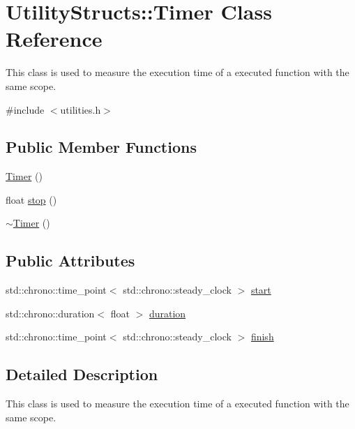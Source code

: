 \hypertarget{class_utility_structs_1_1_timer}{}\section{Utility\+Structs\+:\+:Timer Class Reference}
\label{class_utility_structs_1_1_timer}


This class is used to measure the execution time of a executed function with the same scope.  




{\ttfamily \#include $<$utilities.\+h$>$}

\subsection*{Public Member Functions}
\begin{DoxyCompactItemize}
\item 
\hyperlink{class_utility_structs_1_1_timer_a8513b72cae3808920cc5f76c28b34d63}{Timer} ()
\item 
float \hyperlink{class_utility_structs_1_1_timer_a12f62b57c263d563efd6089cff52355f}{stop} ()
\item 
\hyperlink{class_utility_structs_1_1_timer_a377c1febadb76e78d9a36bd81b3ab676}{$\sim$\+Timer} ()
\end{DoxyCompactItemize}
\subsection*{Public Attributes}
\begin{DoxyCompactItemize}
\item 
std\+::chrono\+::time\+\_\+point$<$ std\+::chrono\+::steady\+\_\+clock $>$ \hyperlink{class_utility_structs_1_1_timer_a60bc754cb86990dad0003e8d49048c07}{start}
\item 
std\+::chrono\+::duration$<$ float $>$ \hyperlink{class_utility_structs_1_1_timer_aa78ff6477de7008371025bd459a262e4}{duration}
\item 
std\+::chrono\+::time\+\_\+point$<$ std\+::chrono\+::steady\+\_\+clock $>$ \hyperlink{class_utility_structs_1_1_timer_a9b87226726489b3885d6faf4373c34b5}{finish}
\end{DoxyCompactItemize}


\subsection{Detailed Description}
This class is used to measure the execution time of a executed function with the same scope. 

